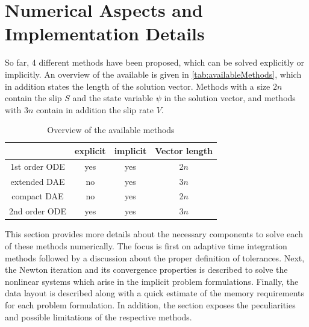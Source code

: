 \section{Numerical Aspects and Implementation Details}
So far, 4 different methods have been proposed, which can be solved explicitly or implicitly. An overview of the available is given in \autoref{tab:availableMethods}, which in addition states the length of the solution vector. Methods with a size $2n$ contain the slip $S$ and the state variable $\psi$ in the solution vector, and methods with $3n$ contain in addition the slip rate $V$.
\begin{table}[H]
	\centering 
	\begin{tabular}{ | c | c c | c |}
		\hline	
						& explicit	& implicit 	& Vector length\\ \hline
		1st order ODE 	& yes 		& yes 		& 2$n$\\  
		extended DAE  	& no 		& yes 		& 3$n$\\
		compact DAE  	& no 		& yes 		& 2$n$\\
		2nd order ODE  	& yes 		& yes 		& 3$n$\\
		\hline
	\end{tabular}
	\caption{Overview of the available methods}
	\label{tab:availableMethods}
\end{table}
This section provides more details about the necessary components to solve each of these methods numerically. The focus is first on adaptive time integration methods followed by a discussion about the proper definition of tolerances. Next, the Newton iteration and its convergence properties is described to solve the nonlinear systems which arise in the implicit problem formulations. Finally, the data layout is described along with a quick estimate of the memory requirements for each problem formulation. In addition, the section exposes the peculiarities and possible limitations of the respective methods.

